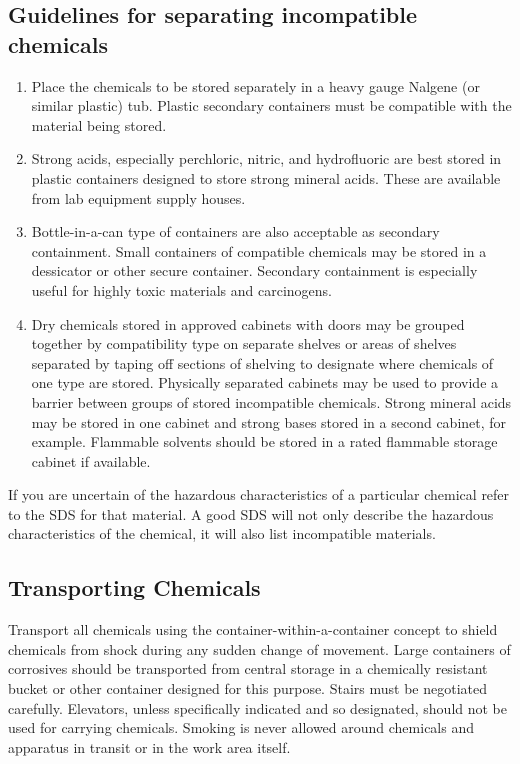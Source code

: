 \documentclass[letterpaper,10pt,english]{sphinxmanual}
\begin{document}
\subsection{Guidelines for separating incompatible chemicals}
\label{\detokenize{Laboratory_Safety/Laboratory_Safety:guidelines-for-separating-incompatible-chemicals}}\begin{enumerate}
\item {} 
Place the chemicals to be stored separately in a heavy gauge Nalgene (or similar plastic) tub. Plastic secondary containers must be compatible with the material being stored.

\item {} 
Strong acids, especially perchloric, nitric, and hydrofluoric are best stored in plastic containers designed to store strong mineral acids. These are available from lab equipment supply houses.

\item {} 
Bottle-in-a-can type of containers are also acceptable as secondary containment. Small containers of compatible chemicals may be stored in a dessicator or other secure container. Secondary containment is especially useful for highly toxic materials and carcinogens.

\item {} 
Dry chemicals stored in approved cabinets with doors may be grouped together by compatibility type on separate shelves or areas of shelves separated by taping off sections of shelving to designate where chemicals of one type are stored. Physically separated cabinets may be used to provide a barrier between groups of stored incompatible chemicals. Strong mineral acids may be stored in one cabinet and strong bases stored in a second cabinet, for example. Flammable solvents should be stored in a rated flammable storage cabinet if available.

\end{enumerate}

If you are uncertain of the hazardous characteristics of a particular chemical refer to the SDS for that material. A good SDS will not only describe the hazardous characteristics of the chemical, it will also list incompatible materials.


\subsection{Transporting Chemicals}
\label{\detokenize{Laboratory_Safety/Laboratory_Safety:transporting-chemicals}}
Transport all chemicals using the container-within-a-container concept to shield chemicals from shock during any sudden change of movement. Large containers of corrosives should be transported from central storage in a chemically resistant bucket or other container designed for this purpose. Stairs must be negotiated carefully. Elevators, unless specifically indicated and so designated, should not be used for carrying chemicals. Smoking is never allowed around chemicals and apparatus in transit or in the work area itself.
\end{document}
